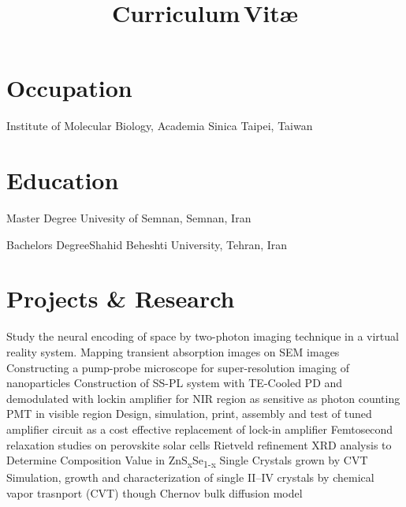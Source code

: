 \documentclass[11pt,a4paper,sans]{moderncv}
\title{Curriculum\,Vit\ae}
\begin{document}
\makecvtitle
\vspace{-1.5cm}

\section{Occupation}
	{Institute of Molecular Biology, Academia Sinica}
	{Taipei, Taiwan}{}{}

\section{Education}
 {Master Degree} {Univesity 
	of Semnan, Semnan, Iran} {} {}{}

		{Bachelors Degree}{Shahid 
		Beheshti University, Tehran, Iran}{}{}{}
\section{Projects \& Research}
		{Study the neural encoding of space by two-photon 
		imaging technique in a virtual reality system.}
		{Mapping transient absorption images on SEM images}
		{Constructing a pump-probe microscope for super-resolution 
		imaging of nanoparticles}
		{Construction of SS-PL system with TE-Cooled PD 
		and demodulated with lockin amplifier for NIR region as 
		sensitive as photon counting PMT in visible region}
		{Design, simulation, print, assembly and test 
		of tuned amplifier circuit as a cost effective replacement 
		of lock-in amplifier}
		{Femtosecond relaxation studies on perovskite solar cells}
		{Rietveld refinement XRD analysis to 
		Determine Composition Value in ZnS\textsubscript{x}Se\textsubscript{1-x} 
		Single Crystals grown by CVT}
		{Simulation, growth and characterization 
		of single II--IV crystals 
		by chemical vapor trasnport (CVT) though Chernov bulk diffusion model}
\end{document}
